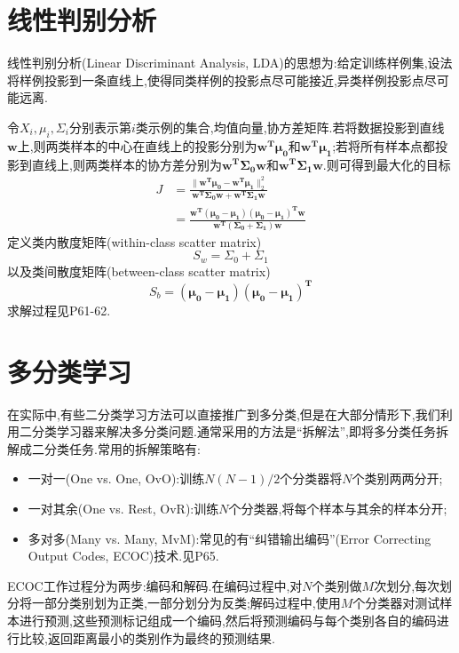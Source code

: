 \section{线性判别分析}

线性判别分析(Linear Discriminant Analysis, LDA)的思想为:给定训练样例集,设法将样例投影到一条直线上,使得同类样例的投影点尽可能接近,异类样例投影点尽可能远离.

令$X_i,\mu_i,\Sigma_i$分别表示第$i$类示例的集合,均值向量,协方差矩阵.若将数据投影到直线$\mathbf w$上,则两类样本的中心在直线上的投影分别为$\mathbf{w^T\mu_0}$和$\mathbf{w^T\mu_1}$;若将所有样本点都投影到直线上,则两类样本的协方差分别为$\mathbf{w^T\Sigma_0w}$和$\mathbf{w^T\Sigma_1w}$.则可得到最大化的目标
\begin{equation}\begin{split}
J&=\frac{\|\mathbf{w^T\mu_0-w^T\mu_1}\|_2^2}{\mathbf{w^T\Sigma_0w+w^T\Sigma_1w}}\\
&=\frac{\mathbf{w^T(\mu_0-\mu_1)(\mu_0-\mu_1)^Tw}}{\mathbf{w^T(\Sigma_0+\Sigma_1)w}}
\end{split}\end{equation}
定义类内散度矩阵(within-class scatter matrix)
\begin{equation}
S_w=\Sigma_0+\Sigma_1
\end{equation}
以及类间散度矩阵(between-class scatter matrix)
\begin{equation}
S_b=\mathbf{(\mu_0-\mu_1)(\mu_0-\mu_1)^T}
\end{equation}
求解过程见P61-62.

\section{多分类学习}

在实际中,有些二分类学习方法可以直接推广到多分类,但是在大部分情形下,我们利用二分类学习器来解决多分类问题.通常采用的方法是``拆解法'',即将多分类任务拆解成二分类任务.常用的拆解策略有:
\begin{itemize}
\item 一对一(One vs. One, OvO):训练$N(N-1)/2$个分类器将$N$个类别两两分开;
\item 一对其余(One vs. Rest, OvR):训练$N$个分类器,将每个样本与其余的样本分开;
\item 多对多(Many vs. Many, MvM):常见的有``纠错输出编码''(Error Correcting Output Codes, ECOC)技术.见P65.
\end{itemize}

ECOC工作过程分为两步:编码和解码.在编码过程中,对$N$个类别做$M$次划分,每次划分将一部分类别划为正类,一部分划分为反类;解码过程中,使用$M$个分类器对测试样本进行预测,这些预测标记组成一个编码,然后将预测编码与每个类别各自的编码进行比较,返回距离最小的类别作为最终的预测结果.

